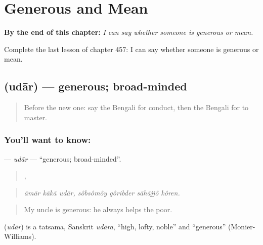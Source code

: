 
\chapter{Generous and Mean}
\label{ch:bn-generous-and-mean}

\begin{chapteropening}
\textbf{By the end of this chapter:} \emph{I can say whether someone is generous or mean.}

Complete the last lesson of chapter 457: I can say whether someone is generous or mean.
\end{chapteropening}

\section[\texorpdfstring{\bn{উদার} (udār)}{উদার (udār)}]{ (udār) — generous; broad-minded}

\label{lesson:BN-C457-udar}



\begin{quote}
Before the new one: say the Bengali for conduct, then the Bengali for to master.
\end{quote}

\subsection*{You'll want to know: }
\textbf{} — \emph{udār} — \textquotedblleft{}generous; broad-minded\textquotedblright{}.

\begin{quote}
  ,    
\end{quote}

\begin{quote}
\emph{āmār kākā udār, sôbsômôy gôribder sāhājjô kôren.}
\end{quote}

\begin{quote}
My uncle is generous: he always helps the poor.
\end{quote}

\begin{cousinweb}
\textbf{} (\emph{udār}) is a tatsama, Sanskrit \emph{udāra}, \textquotedblleft{}high, lofty, noble\textquotedblright{} and \textquotedblleft{}generous\textquotedblright{} (Monier-Williams).
\end{cousinweb}


